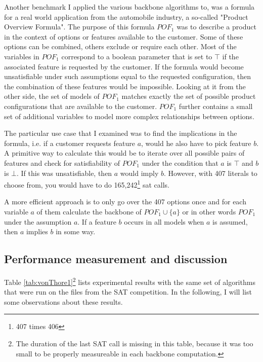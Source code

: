 Another benchmark I applied the various backbone algorithms to, was a formula for a real world application from the automobile industry, a so-called "Product Overview Formula". The purpose of this formula $POF_1$ was to describe a product in the context of options or features available to the customer. Some of these options can be combined, others exclude or require each other. Most of the variables in $POF_1$ correspond to a boolean parameter that is set to $\top$ if the associated feature is requested by the customer. If the formula would become unsatisfiable under such assumptions equal to the requested configuration, then the combination of these features would be impossible. Looking at it from the other side, the set of models of $POF_1$ matches exactly the set of possible product configurations that are available to the customer. $POF_1$ further contains a small set of additional variables to model more complex relationships between options.

The particular use case that I examined was to find the implications in the formula, i.e. if a customer requests feature $a$, would he also have to pick feature $b$. A primitive way to calculate this would be to iterate over all possible pairs of features 
and check for satisfiability of $POF_1$ under the condition that $a$ is $\top$ and $b$ is $\bot$. If this was unsatisfiable, then $a$ would imply $b$. However, with 407 literals to choose from, you would have to do 165,242\footnote{407 times 406} sat calls. 

A more efficient approach is to only go over the 407 options once and for each variable $a$ of them calculate the backbone of $POF_1 \cup \{a\}$ or in other words $POF_1$ under the assumption $a$. If a feature $b$ occurs in all models when $a$ is assumed, then $a$ implies $b$ in some way.


\subsection{Performance measurement and discussion}
Table \ref{tab:vonThore1}\footnote{The duration of the last SAT call is missing in this table, because it was too small to be properly measureable in each backbone computation.} lists experimental results with the same set of algorithms that were run on the files from the SAT competition. In the following, I will list some observations about these results.


